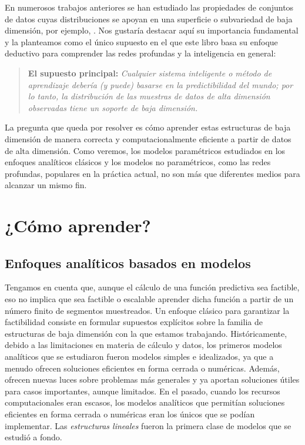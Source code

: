 \documentclass[../../book-main_es.tex]{subfiles}
\begin{document}
En numerosos trabajos anteriores se han estudiado las propiedades de conjuntos de datos cuyas distribuciones
se apoyan en una superficie o subvariedad de baja dimensión, por ejemplo,
\cite{ALLARD2012435,LITTLE2017504}. Nos gustaría destacar aquí su
importancia fundamental y la planteamos como el único supuesto en el que este libro
basa su enfoque deductivo para comprender las redes profundas y la inteligencia
en general:
\begin{quote}
    \textbf{El supuesto principal:} \textit{Cualquier sistema inteligente o
        método de aprendizaje debería (y puede) basarse en la predictibilidad
        del mundo; por lo tanto, la distribución de las muestras de datos de alta dimensión
    observadas tiene un soporte de baja dimensión.}
\end{quote}
La pregunta que queda por resolver es cómo aprender estas estructuras de baja dimensión
de manera correcta y computacionalmente eficiente a partir de
datos de alta dimensión. Como veremos, los modelos paramétricos estudiados en
los enfoques analíticos clásicos y los modelos no paramétricos, como
las redes profundas, populares en la práctica actual, no son más que diferentes medios
para alcanzar un mismo fin.

\section{¿Cómo aprender?}

\subsection{Enfoques analíticos basados en modelos}
\label{sec:analytical}
Tengamos en cuenta que, aunque el cálculo de una función predictiva sea factible,
eso no implica que sea factible o escalable aprender dicha
función a partir de un número finito de segmentos muestreados.
Un enfoque clásico para garantizar la factibilidad consiste en formular 
supuestos explícitos sobre la familia de estructuras de baja dimensión 
con la que estamos trabajando. Históricamente, debido a las limitaciones en 
materia de cálculo y datos, los primeros modelos analíticos que se estudiaron 
fueron modelos simples e idealizados, ya que a menudo ofrecen soluciones eficientes 
en forma cerrada o numéricas. Además, ofrecen nuevas luces
sobre problemas más generales y ya aportan soluciones útiles 
para casos importantes, aunque limitados. En el pasado, cuando los recursos 
computacionales eran escasos, los modelos analíticos que permitían soluciones 
eficientes en forma cerrada o numéricas eran los únicos que se 
podían implementar. Las \textit{estructuras lineales} fueron la primera clase 
de modelos que se estudió a fondo.
\end{document}
